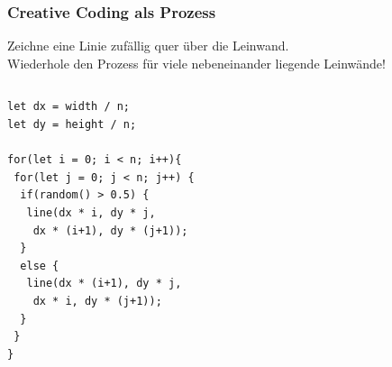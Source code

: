 \documentclass[aspectratio=169]{beamer}
\begin{document}
\begin{frame}[fragile]
\frametitle{Creative Coding als Prozess}
Zeichne eine Linie zufällig quer über die Leinwand.\\
Wiederhole den Prozess für viele nebeneinander liegende Leinwände!
\begin{columns}
\begin{column}{0.5\textwidth}
{\color{p5darkbasicstyle}
\begin{lstlisting}
let dx = width / n;
let dy = height / n;
  
for(let i = 0; i < n; i++){
 for(let j = 0; j < n; j++) {
  if(random() > 0.5) {
   line(dx * i, dy * j, 
    dx * (i+1), dy * (j+1));
  }
  else {
   line(dx * (i+1), dy * j, 
    dx * i, dy * (j+1));
  }
 }
} 
\end{lstlisting}
}
\end{column}
\begin{column}{0.5\textwidth}
\end{column}
\end{columns}
\end{frame}
\end{document}
